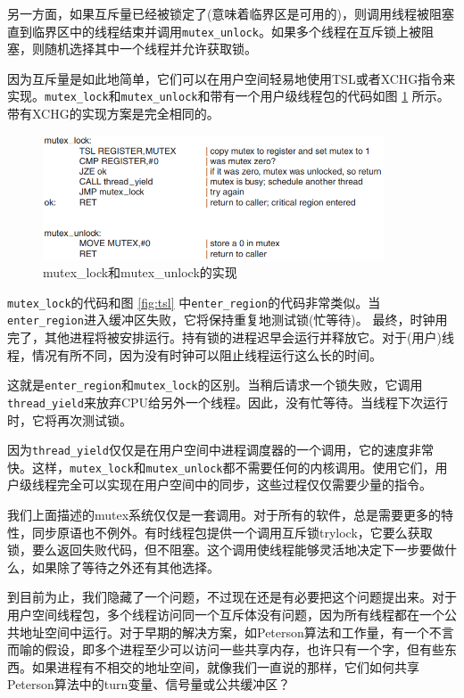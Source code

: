 	另一方面，如果互斥量已经被锁定了(意味着临界区是可用的)，则调用线程被阻塞直到临界区中的线程结束并调用\texttt{mutex\_unlock}。如果多个线程在互斥锁上被阻塞，则随机选择其中一个线程并允许获取锁。 
	
	因为互斥量是如此地简单，它们可以在用户空间轻易地使用TSL或者XCHG指令来实现。\texttt{mutex\_lock}和\texttt{mutex\_unlock}和带有一个用户级线程包的代码如图 \ref{fig:mutex} 所示。带有XCHG的实现方案是完全相同的。
	
	\begin{figure}[ht]\small
		\centering
		\includegraphics[width=0.90\textwidth]{FIG/2-29.png}
		\caption{mutex\_lock和mutex\_unlock的实现} \label{fig:mutex}
	\end{figure}
	
	\texttt{mutex\_lock}的代码和图 \ref{fig:tsl} 中\texttt{enter\_region}的代码非常类似。当\texttt{enter\_region}进入缓冲区失败，它将保持重复地测试锁(忙等待)。
	最终，时钟用完了，其他进程将被安排运行。持有锁的进程迟早会运行并释放它。对于(用户)线程，情况有所不同，因为没有时钟可以阻止线程运行这么长的时间。
	
	这就是\texttt{enter\_region}和\texttt{mutex\_lock}的区别。当稍后请求一个锁失败，它调用\texttt{thread\_yield}来放弃CPU给另外一个线程。因此，没有忙等待。当线程下次运行时，它将再次测试锁。
	
	因为\texttt{thread\_yield}仅仅是在用户空间中进程调度器的一个调用，它的速度非常快。这样，\texttt{mutex\_lock}和\texttt{mutex\_unlock}都不需要任何的内核调用。使用它们，用户级线程完全可以实现在用户空间中的同步，这些过程仅仅需要少量的指令。
	
	我们上面描述的mutex系统仅仅是一套调用。对于所有的软件，总是需要更多的特性，同步原语也不例外。有时线程包提供一个调用互斥锁trylock，它要么获取锁，要么返回失败代码，但不阻塞。这个调用使线程能够灵活地决定下一步要做什么，如果除了等待之外还有其他选择。
	
	到目前为止，我们隐藏了一个问题，不过现在还是有必要把这个问题提出来。对于用户空间线程包，多个线程访问同一个互斥体没有问题，因为所有线程都在一个公共地址空间中运行。对于早期的解决方案，如Peterson算法和工作量，有一个不言而喻的假设，即多个进程至少可以访问一些共享内存，也许只有一个字，但有些东西。如果进程有不相交的地址空间，就像我们一直说的那样，它们如何共享Peterson算法中的turn变量、信号量或公共缓冲区？ 
	
